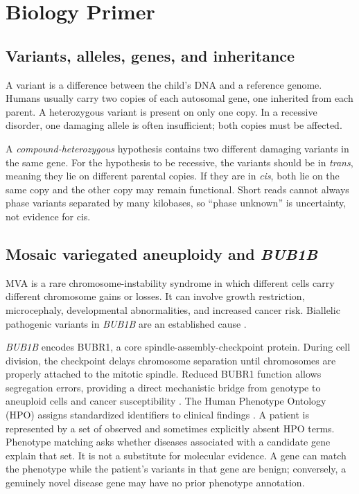 \documentclass[11pt]{article}
\begin{document}
\section{Biology Primer}

\subsection{Variants, alleles, genes, and inheritance}

A variant is a difference between the child's DNA and a reference genome. Humans usually carry two copies of each autosomal gene, one inherited from each parent. A heterozygous variant is present on only one copy. In a recessive disorder, one damaging allele is often insufficient; both copies must be affected.

A \emph{compound-heterozygous} hypothesis contains two different damaging variants in the same gene. For the hypothesis to be recessive, the variants should be in \emph{trans}, meaning they lie on different parental copies. If they are in \emph{cis}, both lie on the same copy and the other copy may remain functional. Short reads cannot always phase variants separated by many kilobases, so ``phase unknown'' is uncertainty, not evidence for cis.

\subsection{Mosaic variegated aneuploidy and \textit{BUB1B}}

MVA is a rare chromosome-instability syndrome in which different cells carry different chromosome gains or losses. It can involve growth restriction, microcephaly, developmental abnormalities, and increased cancer risk. Biallelic pathogenic variants in \textit{BUB1B} are an established cause \citep{bub1b2004}.

\textit{BUB1B} encodes BUBR1, a core spindle-assembly-checkpoint protein. During cell division, the checkpoint delays chromosome separation until chromosomes are properly attached to the mitotic spindle. Reduced BUBR1 function allows segregation errors, providing a direct mechanistic bridge from genotype to aneuploid cells and cancer susceptibility \citep{bub1bmechanism2010}.
The Human Phenotype Ontology (HPO) assigns standardized identifiers to clinical findings \citep{hpo2021}. A patient is represented by a set of observed and sometimes explicitly absent HPO terms. Phenotype matching asks whether diseases associated with a candidate gene explain that set. It is not a substitute for molecular evidence. A gene can match the phenotype while the patient's variants in that gene are benign; conversely, a genuinely novel disease gene may have no prior phenotype annotation.
\end{document}

